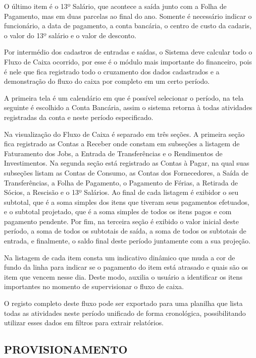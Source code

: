 \documentclass[
  12pt,				%
  openany,
  oneside,
  a4paper,			%
  english,			%
  brazil
]{article}
\numberwithin{figure}{section}
\numberwithin{table}{section}
\newcounter{subsubsubsection}[subsubsection]
\begin{document}
O último item é o 13º Salário, que acontece a saída junto com a Folha de Pagamento, mas em duas parcelas ao final do ano. Somente é necessário indicar o funcionário, a data de pagamento, a conta bancária, o centro de custo da cadaris, o valor do 13º salário e o valor de desconto.




Por intermédio dos cadastros de entradas e saídas, o Sistema deve calcular todo o Fluxo de Caixa ocorrido, por esse é o módulo mais importante do financeiro, pois é nele que fica registrado todo o cruzamento dos dados cadastrados e a demonstração do fluxo do caixa por completo em um certo período.

A primeira tela é um calendário em que é possível selecionar o período, na tela seguinte é escolhido a Conta Bancária, assim o sistema retorna à todas atividades registradas da conta e neste período especificado.

Na visualização do Fluxo de Caixa é separado em três seções. A primeira seção fica registrado as Contas a Receber onde constam em subseções a listagem de Faturamento dos Jobs, a Entrada de Transferências e o Rendimentos de Investimentos. Na segunda seção está registrado as Contas à Pagar, na qual suas subseções listam as Contas de Consumo, as Contas dos Fornecedores, a Saída de Transferências, a Folha de Pagamento, o Pagamento de Férias, a Retirada de Sócios, a Rescisão e o 13º Salários. Ao final de cada listagem é exibidor o seu subtotal, que é a soma simples dos itens que tiveram seus pagamentos efetuados, e o subtotal projetado, que é a soma simples de todos os itens pagos e com pagamento pendente. Por fim, na terceira seção é exibido o valor inicial deste período, a soma de todos os subtotais de saída, a soma de todos os subtotais de entrada, e finalmente, o saldo final deste período juntamente com a sua projeção.

Na listagem de cada item consta um indicativo dinâmico que muda a cor de fundo da linha para indicar se o pagamento do item está atrasado e quais são os item que vencem nesse dia. Deste modo, auxilia o usuário a identificar os itens importantes no momento de supervisionar o fluxo de caixa.

O registo completo deste fluxo pode ser exportado para uma planilha que lista todas as atividades neste período unificado de forma cronológica, possibilitando utilizar esses dados em filtros para extrair relatórios.



\subsection{PROVISIONAMENTO}
\end{document}
